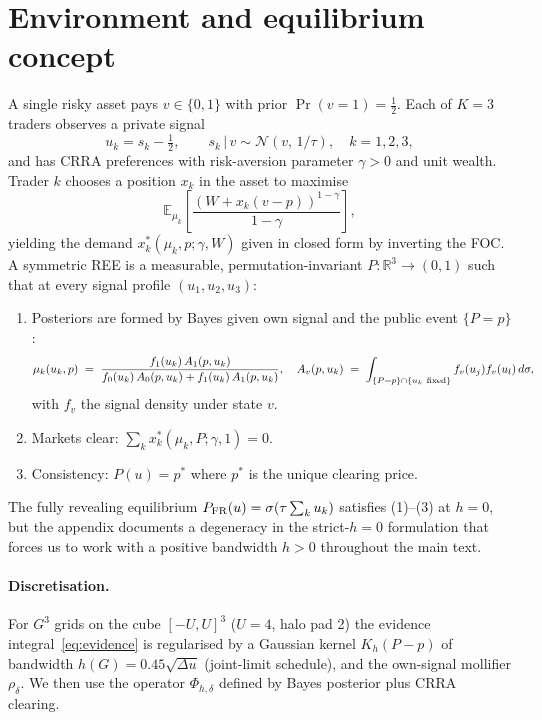 \documentclass[11pt]{article}
\newcommand{\E}{\mathbb{E}}
\newcommand{\R}{\mathbb{R}}
\newcommand{\1}{\mathbf{1}}
\begin{document}
\section{Environment and equilibrium concept}

A single risky asset pays $v\in\{0,1\}$ with prior $\Pr(v=1)=\tfrac12$.
Each of $K=3$ traders observes a private signal
\begin{equation}
u_k = s_k - \tfrac12,\qquad s_k\,|\,v\sim\mathcal N(v,\,1/\tau),\quad k=1,2,3,
\end{equation}
and has CRRA preferences with risk-aversion parameter $\gamma>0$ and unit
wealth. Trader $k$ chooses a position $x_k$ in the asset to maximise
\begin{equation}
\E_{\mu_k}\left[\frac{(W+x_k(v-p))^{1-\gamma}}{1-\gamma}\right],
\end{equation}
yielding the demand $x_k^*(\mu_k,p;\gamma,W)$ given in closed form by
inverting the FOC. A symmetric REE is a measurable, permutation-invariant
$P:\R^3\to(0,1)$ such that at every signal profile $(u_1,u_2,u_3)$:
\begin{enumerate}
\item Posteriors are formed by Bayes given own signal and the public
event $\{P=p\}$:
\begin{equation}
\mu_k(u_k,p) \;=\; \frac{f_1(u_k)\,A_1(p,u_k)}{f_0(u_k)\,A_0(p,u_k) + f_1(u_k)\,A_1(p,u_k)},
\quad
A_v(p,u_k) \;=\; \int_{\{P=p\}\cap\{u_k\ \rm{fixed}\}} f_v(u_j)f_v(u_l)\,d\sigma,
\label{eq:evidence}
\end{equation}
with $f_v$ the signal density under state $v$.
\item Markets clear: $\sum_k x_k^*(\mu_k,P;\gamma,1) = 0$.
\item Consistency: $P(u) = p^*$ where $p^*$ is the unique clearing price.
\end{enumerate}
The fully revealing equilibrium
$P_{\rm FR}(u)=\sigma(\tau\sum_k u_k)$ satisfies (1)--(3) at $h=0$, but
the appendix documents a degeneracy in the strict-$h{=}0$ formulation that
forces us to work with a positive bandwidth $h>0$ throughout the main
text.

\paragraph{Discretisation.}
For $G^3$ grids on the cube $[-U,U]^3$ ($U=4$, halo pad 2) the evidence
integral~\eqref{eq:evidence} is regularised by a Gaussian kernel
$K_h(P-p)$ of bandwidth $h(G)=0.45\sqrt{\Delta u}$ (joint-limit
schedule), and the own-signal mollifier $\rho_\delta$. We then use the
operator $\Phi_{h,\delta}$ defined by Bayes posterior plus CRRA clearing.
\end{document}
